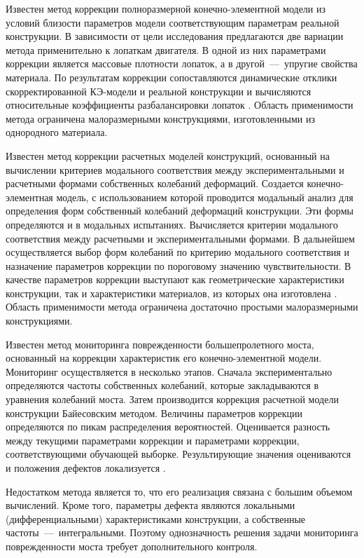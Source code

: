 Известен метод коррекции полноразмерной конечно-элементной модели из условий близости параметров модели соответствующим параметрам реальной конструкции. В зависимости от цели исследования предлагаются две вариации метода применительно к лопаткам двигателя. В одной из них параметрами коррекции является массовые плотности лопаток, а в другой~---~упругие свойства материала. По результатам коррекции сопоставляются динамические отклики скорректированной КЭ-модели и реальной конструкции и вычисляются относительные коэффициенты разбалансировки лопаток \cite{lib:modelUpdating:WO2019209410A1}. Область применимости метода ограничена малоразмерными конструкциями, изготовленными из однородного материала. 

Известен метод коррекции расчетных моделей конструкций, основанный на вычислении критериев модального соответствия между экспериментальными и расчетными формами собственных колебаний деформаций. Создается конечно-элементная модель, с использованием которой проводится модальный анализ для определения форм собственный колебаний деформаций конструкции. Эти формы определяются и в модальных испытаниях. Вычисляется критерии модального соответствия между расчетными и экспериментальными формами. В дальнейшем осуществляется выбор форм колебаний по критерию модального соответствия и назначение параметров коррекции по пороговому значению чувствительности. В качестве параметров коррекции выступают как геометрические характеристики конструкции, так и характеристики материалов, из которых она изготовлена \cite{lib:modelUpdating:CN106529055A}. Область применимости метода ограничена достаточно простыми малоразмерными конструкциями.
 
Известен метод мониторинга поврежденности большепролетного моста, основанный на коррекции характеристик его конечно-элементной модели. Мониторинг осуществляется в несколько этапов. Сначала экспериментально определяются частоты собственных колебаний, которые закладываются в уравнения колебаний моста. Затем производится коррекция расчетной модели конструкции Байесовским методом. Величины параметров коррекции определяются по пикам распределения вероятностей. Оценивается разность между текущими параметрами коррекции и параметрами коррекции, соответствующими обучающей выборке. Результирующие значения оцениваются и положения дефектов локализуется \cite{lib:modelUpdating:CN107687872A}. 

Недостатком метода является то, что его реализация связана с большим объемом вычислений. Кроме того, параметры дефекта являются локальными (дифференциальными) характеристиками конструкции, а собственные частоты~---~интегральными. Поэтому однозначность решения задачи мониторинга поврежденности моста требует дополнительного контроля. 

